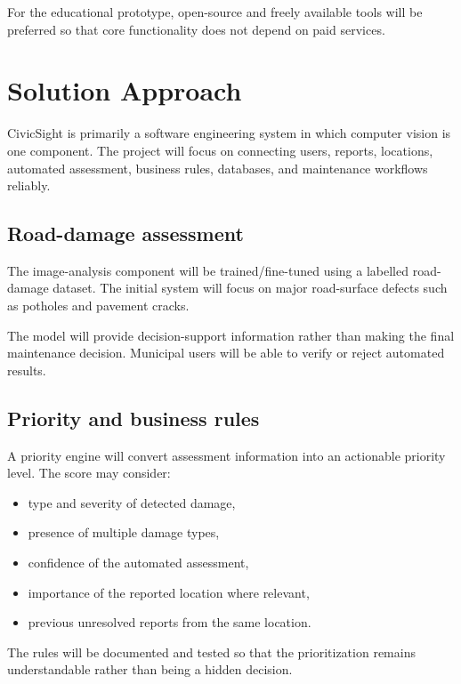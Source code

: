 \documentclass[11pt,a4paper]{article}
\begin{document}
For the educational prototype, open-source and freely available tools will be preferred so that core functionality does not depend on paid services.


\section{Solution Approach}

CivicSight is primarily a software engineering system in which computer vision is one component. The project will focus on connecting users, reports, locations, automated assessment, business rules, databases, and maintenance workflows reliably.

\subsection{Road-damage assessment}

The image-analysis component will be trained/fine-tuned using a labelled road-damage dataset. The initial system will focus on major road-surface defects such as potholes and pavement cracks.

The model will provide decision-support information rather than making the final maintenance decision. Municipal users will be able to verify or reject automated results.

\subsection{Priority and business rules}

A priority engine will convert assessment information into an actionable priority level. The score may consider:

\begin{itemize}[leftmargin=0.6cm]

    \item type and severity of detected damage,
    \item presence of multiple damage types,
    \item confidence of the automated assessment,
    \item importance of the reported location where relevant,
    \item previous unresolved reports from the same location.

\end{itemize}

The rules will be documented and tested so that the prioritization remains understandable rather than being a hidden decision.
\end{document}
